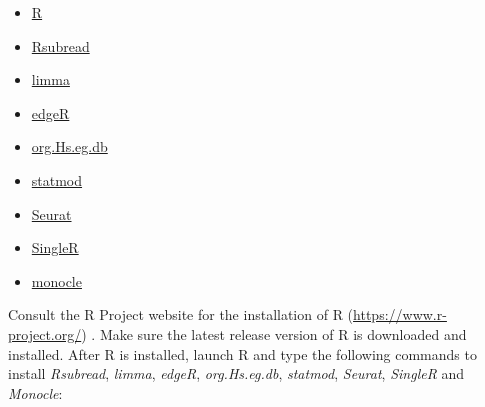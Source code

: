 \documentclass[
]{book}
\providecommand{\tightlist}{%
  \setlength{\itemsep}{0pt}\setlength{\parskip}{0pt}}
\begin{document}
\begin{itemize}
\tightlist
\item
  \href{https://www.r-project.org}{R}
\item
  \href{http://bioconductor.org/packages/release/bioc/html/Rsubread.html}{Rsubread}
\item
  \href{http://bioconductor.org/packages/release/bioc/html/limma.html}{limma}
\item
  \href{http://bioconductor.org/packages/release/bioc/html/edgeR.html}{edgeR}
\item
  \href{http://bioconductor.org/packages/release/data/annotation/html/org.Hs.eg.db.html}{org.Hs.eg.db}
\item
  \href{https://CRAN.R-project.org/package=statmod}{statmod}
\item
  \href{https://cloud.r-project.org/package=Seurat}{Seurat}
\item
  \href{https://bioconductor.org/packages/release/bioc/html/SingleR.html}{SingleR}
\item
  \href{https://bioconductor.org/packages/release/bioc/html/monocle.html}{monocle}
\end{itemize}

Consult the R Project website for the installation of R (\url{https://www.r-project.org/}) \citep{R-base}. Make sure the latest release version of R is downloaded and installed. After R is installed, launch R and type the following commands to install \emph{Rsubread}, \emph{limma}, \emph{edgeR}, \emph{org.Hs.eg.db}, \emph{statmod}, \emph{Seurat}, \emph{SingleR} and \emph{Monocle}:
\end{document}
